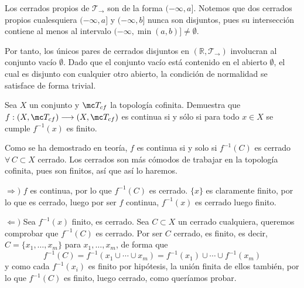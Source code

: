 \begin{sol}
    Los cerrados propios de $\mathcal{T}_{\rightarrow}$ son de la forma $(-\infty, a]$. Notemos que dos cerrados propios cualesquiera $(-\infty, a]$ y $(-\infty, b]$ nunca son disjuntos, pues su intersección contiene al menos al intervalo $(-\infty, \min(a,b)] \neq \emptyset$.
    
    Por tanto, los únicos pares de cerrados disjuntos en $(\mathbb{R}, \mathcal{T}_{\rightarrow})$ involucran al conjunto vacío $\emptyset$. Dado que el conjunto vacío está contenido en el abierto $\emptyset$, el cual es disjunto con cualquier otro abierto, la condición de normalidad se satisface de forma trivial.
\end{sol}
\begin{ejer}
    [88] Sea $X$ un conjunto y $\mc T_{cf}$ la topología cofinita. Demuestra que $f: (X, \mc T_{cf}) \longrightarrow (X, \mc T_{cf})$ es continua si y sólo si para todo $x \in X$ se cumple $f^{-1}(x)$ es finito.
\end{ejer}
\begin{sol}
    Como se ha demostrado en teor\'ia, $f$ es continua si y solo si $f^{-1}(C)$ es cerrado $\forall \, C \subset X$ cerrado. Los cerrados son m\'as c\'omodos de trabajar en la topolog\'ia cofinita, pues son finitos, as\'i que as\'i lo haremos. 

    $\Rightarrow)$ $f$ es continua, por lo que $f^{-1}(C)$ es cerrado. $\{x\}$ es claramente finito, por lo que es cerrado, luego por ser $f$ continua, $f^{-1}(x)$ es cerrado luego finito.

    $\Leftarrow)$ Sea $f^{-1}(x)$ finito, es cerrado. Sea $C \subset X$ un cerrado cualquiera, queremos comprobar que $f^{-1}(C)$ es cerrado. Por ser $C$ cerrado, es finito, es decir, $C = \{x_1, \ldots, x_m\}$ para $x_1, \ldots, x_m$, de forma que 
    $$f^{-1}(C) = f^{-1}(x_1\cup \cdots\cup x_m) = f^{-1}(x_1) \cup \cdots \cup f^{-1}(x_m)$$
    y como cada $f^{-1}(x_i)$ es finito por hip\'otesis, la uni\'on finita de ellos tambi\'en, por lo que $f^{-1}(C)$ es finito, luego cerrado, como quer\'iamos probar. 
\end{sol}
